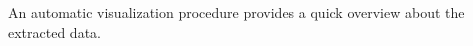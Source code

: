 \label{fig:bar} An automatic visualization procedure provides a quick overview about the extracted data.